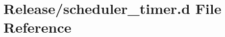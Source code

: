 \hypertarget{scheduler__timer_8d}{}\section{Release/scheduler\+\_\+timer.d File Reference}
\label{scheduler__timer_8d}
